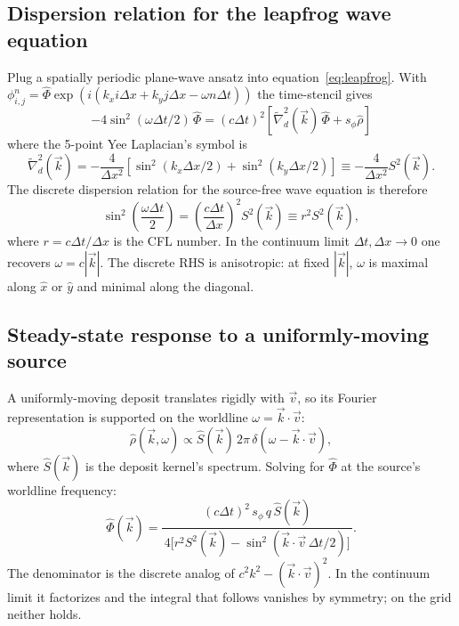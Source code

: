 \documentclass[11pt,a4paper]{article}
\begin{document}
\subsection{Dispersion relation for the leapfrog wave equation}

Plug a spatially periodic plane-wave ansatz into
equation~\ref{eq:leapfrog}.  With
$\phi^n_{i,j} = \hat\Phi \exp(i (k_x i \Delta x + k_y j \Delta x - \omega n \Delta t))$
the time-stencil gives
\begin{equation}
-4 \sin^2(\omega \Delta t/2)\, \hat\Phi
 = (c \Delta t)^2 \left[ \tilde\nabla^2_d(\vec k)\, \hat\Phi
                        + s_\phi \hat\rho \right]
\end{equation}
where the 5-point Yee Laplacian's symbol is
\begin{equation}
\tilde\nabla^2_d(\vec k)
 = -\frac{4}{\Delta x^2}\!\left[
     \sin^2(k_x \Delta x/2) + \sin^2(k_y \Delta x/2)
   \right]
   \equiv -\frac{4}{\Delta x^2} S^2(\vec k).
\end{equation}
The discrete dispersion relation for the source-free wave equation
is therefore
\begin{equation}
\sin^2\!\left(\frac{\omega \Delta t}{2}\right)
 = \left(\frac{c \Delta t}{\Delta x}\right)^2 S^2(\vec k)
 \equiv r^2 S^2(\vec k),
\label{eq:dispersion}
\end{equation}
where $r = c \Delta t / \Delta x$ is the CFL number.  In the
continuum limit $\Delta t, \Delta x \to 0$ one recovers $\omega = c |\vec k|$.
The discrete RHS is anisotropic: at fixed $|\vec k|$, $\omega$ is
maximal along $\hat x$ or $\hat y$ and minimal along the diagonal.

\subsection{Steady-state response to a uniformly-moving source}

A uniformly-moving deposit translates rigidly with $\vec v$, so its
Fourier representation is supported on the worldline
$\omega = \vec k \cdot \vec v$:
\begin{equation}
\hat\rho(\vec k, \omega) \propto \hat S(\vec k)\,
 2\pi\,\delta\!\left(\omega - \vec k \cdot \vec v\right),
\end{equation}
where $\hat S(\vec k)$ is the deposit kernel's spectrum.  Solving for
$\hat\Phi$ at the source's worldline frequency:
\begin{equation}
\hat\Phi(\vec k)
 = \frac{(c \Delta t)^2 \, s_\phi \, q \, \hat S(\vec k)}
       {\,4\bigl[r^2 S^2(\vec k) - \sin^2(\vec k \cdot \vec v\, \Delta t/2)\bigr]\,}.
\label{eq:phi_hat}
\end{equation}
The denominator is the discrete analog of $c^2 k^2 - (\vec k \cdot \vec v)^2$.
In the continuum limit it factorizes and the integral that follows
vanishes by symmetry; on the grid neither holds.
\end{document}
